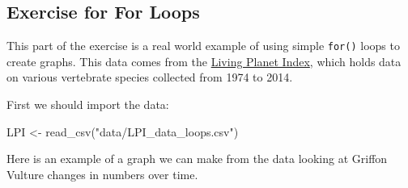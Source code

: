 \documentclass[
]{book}
\newenvironment{Shaded}{\begin{snugshade}}{\end{snugshade}}
\newcommand{\FunctionTok}[1]{\textcolor[rgb]{0.00,0.00,0.00}{#1}}
\newcommand{\NormalTok}[1]{#1}
\newcommand{\OtherTok}[1]{\textcolor[rgb]{0.56,0.35,0.01}{#1}}
\newcommand{\StringTok}[1]{\textcolor[rgb]{0.31,0.60,0.02}{#1}}
\begin{document}
\hypertarget{exercise-for-for-loops}{%
\subsection{Exercise for For Loops}\label{exercise-for-for-loops}}

This part of the exercise is a real world example of using simple \texttt{for()} loops to create graphs. This data comes from the \href{https://livingplanetindex.org/home/index}{Living Planet Index}, which holds data on various vertebrate species collected from 1974 to 2014.

First we should import the data:

\begin{Shaded}
\begin{Highlighting}[]
\NormalTok{LPI }\OtherTok{\textless{}{-}} \FunctionTok{read\_csv}\NormalTok{(}\StringTok{"data/LPI\_data\_loops.csv"}\NormalTok{)}
\end{Highlighting}
\end{Shaded}

Here is an example of a graph we can make from the data looking at Griffon Vulture changes in numbers over time.
\end{document}
